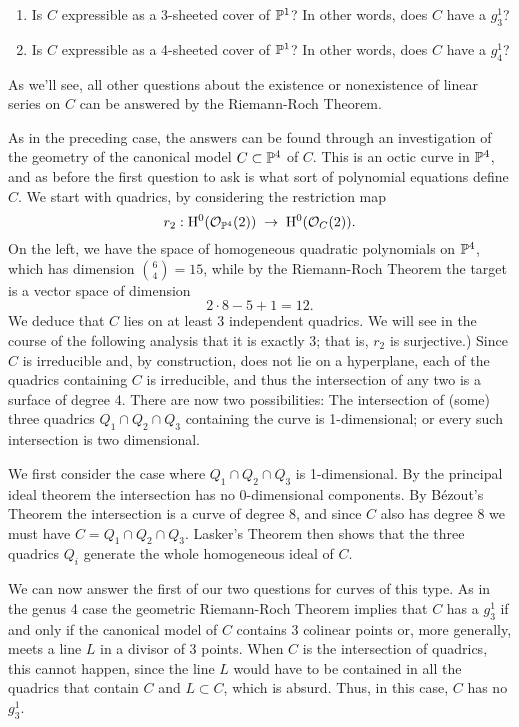 \begin{enumerate}
\item Is $C$ expressible as a 3-sheeted cover of $\PP^1$? In other words, does $C$ have a $g^1_3$?
\item Is $C$ expressible as a 4-sheeted cover of $\PP^1$? In other words, does $C$ have a $g^1_4$?
\end{enumerate}

As we'll see, all other questions about the existence or nonexistence of linear series on $C$ can be answered by the Riemann-Roch Theorem.

As in the preceding case, the answers can be found through an investigation of the geometry of the canonical model $C \subset \PP^4$ of $C$. This is an octic curve in $\PP^4$, and as before the first question to ask is what sort of polynomial equations define $C$. We start with quadrics, by considering the restriction map
$$
r_2 : \HH^0(\cO_{\PP^4}(2)) \; \to \; \HH^0(\cO_{C}(2)).
$$
On the left, we have the space of homogeneous quadratic polynomials on $\PP^4$, which has dimension $\binom{6}{4} = 15$, while by the Riemann-Roch Theorem the target is a vector space of dimension
$$
2\cdot8 - 5 + 1 = 12.
$$
We deduce that $C$ lies on at least 3 independent quadrics. We will see in the course of the following analysis that it is exactly 3; that is, $r_2$ is surjective.) Since $C$ is irreducible and, by construction, does not lie on a hyperplane, each of the quadrics containing $C$ is irreducible, and thus the intersection of any two is a surface of degree 4. There are now two possibilities:  The intersection of (some) three quadrics $Q_1 \cap Q_2 \cap Q_3$ containing the curve is 1-dimensional; or every such intersection is two dimensional. 

We first consider the case where $Q_1 \cap Q_2 \cap Q_3$ is 1-dimensional. By the principal ideal theorem the intersection has no 0-dimensional components. By B\'ezout's Theorem the intersection is a curve of degree 8, and since $C$ also has degree 8 we must have $C=Q_1 \cap Q_2 \cap Q_3$. Lasker's Theorem then shows that the three quadrics $Q_i$ generate the whole homogeneous ideal of $C$.

We can now answer the first of our two questions for curves of this type. As in the genus 4 case the geometric Riemann-Roch Theorem implies that $C$ has a $g^1_3$ if and only if the canonical model of $C$ contains 3 colinear points or, more generally, meets a line $L$ in a divisor of 3 points. When $C$ is the intersection of quadrics, this cannot happen, since the line $L$ would have to be contained in all the quadrics that contain $C$ and $L\subset C$, which is absurd. Thus, in this case, 
$C$ has no $g^1_3$.

